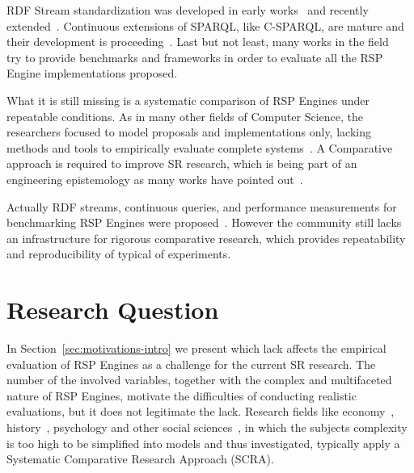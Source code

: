 RDF Stream standardization was developed in early works~\cite{DBLP:journals/expert/ValleCHF09, Lephuoc2011} and recently extended~\cite{DBLP:conf/semweb/BalduiniVDTPC13}. Continuous extensions of SPARQL, like C-SPARQL, are mature and their development is proceeding~\cite{Barbieri2010}. Last but not least, many works in the field ~\cite{Zhang2012,LePhuoc2012c}  try to provide benchmarks and frameworks in order to evaluate all the RSP Engine implementations proposed. 

What it is still missing is a systematic comparison of RSP Engines under repeatable conditions. As in many other fields of Computer Science, the researchers focused to model proposals and implementations only, lacking methods and tools to empirically evaluate complete systems~\cite{Perry:2000:ESS:336512.336586}. A Comparative approach is required to improve SR research, which is being part of an engineering epistemology as many works have pointed out~\cite{Tichy:1995:EEC:209090.209093,Wainer:2009:EEC:1518331.1518552}.

Actually RDF streams, continuous queries, and performance measurements for benchmarking RSP Engines were proposed~\cite{LePhuoc2012c,Zhang2012, DBLP:conf/semweb/DellAglioCBCV13}. However the community still lacks an infrastructure for rigorous comparative research, which provides repeatability and reproducibility of typical of experiments.


\section{Research Question}\label{sec:research-question-intro}

In Section~\ref{sec:motivations-intro} we present which lack affects the empirical evaluation of RSP Engines as a challenge for the current SR research. The number of the involved variables, together with the complex and multifaceted nature of RSP Engines, motivate the difficulties of conducting realistic evaluations, but it does not legitimate the lack. Research fields like economy~\cite{CBO9781139174053A009}, history~\cite{CSS:4411600}, psychology and other social sciences~\cite{felsenstein1985phylogenies}, in which the subjects complexity is too high to be simplified into models and thus investigated, typically apply a Systematic Comparative Research Approach (SCRA).

